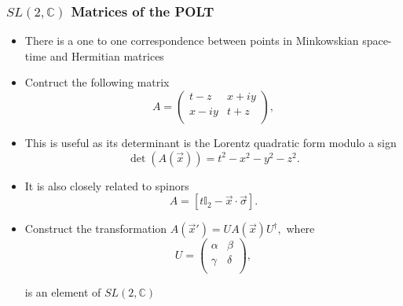 \documentclass[10pt,a4paper]{beamer}
\begin{document}

\begin{frame}
\frametitle{$SL(2,\mathbb{C})$ Matrices of the POLT}
\begin{itemize}
\item<1->{There is a one to one correspondence between points in Minkowskian space-time and Hermitian matrices} 
\item<2->{Contruct the following matrix 
\begin{equation*}
A = 
\left( 
\begin{array}{cc}
t-z    & x + i y \\
x - iy & t+z \\
\end{array} 
\right),
\end{equation*}}
\item<3->{This is useful as its determinant is the Lorentz quadratic form modulo a sign $$\det(A(\vec{x})) = t^2 - x^2 - y^2 - z^2.$$}
\item<4->{It is also closely related to spinors $$A = [t\mathbb{I}_{2} - \vec{x} \cdot \vec{\sigma}].$$}
\item<5->{Construct the transformation $A(\vec{x}') = U A(\vec{x}) U^{\dagger},$ where 
\begin{equation*} 
U = \left( 
\begin{array}{cc}
\alpha & \beta \\
\gamma & \delta \\
\end{array}
\right),
\end{equation*}

\noindent is an element of $SL(2,\mathbb{C})$}
\end{itemize}

\end{frame}
\end{document}
